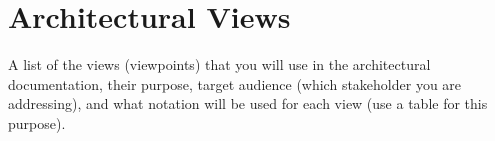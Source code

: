 \section{Architectural Views}
A list of the views (viewpoints) that you will use in the architectural
documentation, their purpose, target audience (which stakeholder you are
addressing), and what notation will be used for each view (use a table for this purpose).